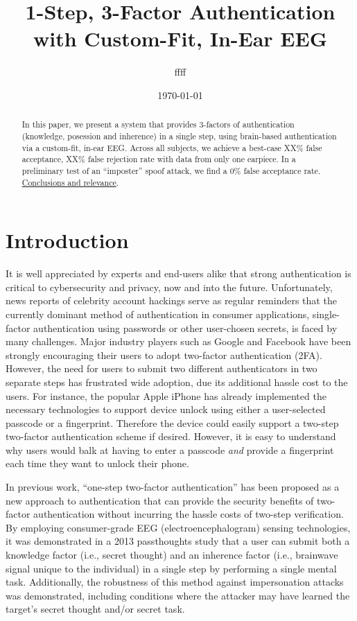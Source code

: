\documentclass[11pt]{article}
\author{ffff}
\date{\today}
\title{1-Step, 3-Factor Authentication with Custom-Fit, In-Ear EEG}
\begin{document}
\maketitle
\begin{abstract}
In this paper, we present a system that provides 3-factors of authentication (knowledge, posession and inherence) in a single step, using brain-based authentication via a custom-fit, in-ear EEG. Across all subjects, we achieve a best-case XX\% false acceptance, XX\% false rejection rate with data from only one earpiece. In a preliminary test of an ``imposter'' spoof attack, we find a 0\% false acceptance rate. \underline{Conclusions and relevance}.
\end{abstract}

\section{Introduction}
\label{sec:org7196b99}

It is well appreciated by experts and end-users alike that strong authentication is
critical to cybersecurity and privacy, now and into the future. Unfortunately,
news 
reports of celebrity account hackings serve as regular reminders that
the currently dominant method of authentication in consumer applications, 
single-factor authentication using passwords or other user-chosen secrets, 
is faced by many challenges. Major industry players such as Google and
Facebook have been strongly encouraging their users to adopt two-factor
authentication (2FA). However, the need for users to submit two different 
authenticators in two separate steps has frustrated wide adoption, 
due its additional hassle cost to the users. For instance, the popular Apple
iPhone has already implemented the necessary technologies to support device
unlock using either a user-selected passcode or a fingerprint. Therefore the
device could easily support a two-step two-factor authentication scheme if
desired. However, it is easy to understand why users would balk at having to
enter a passcode \emph{and} provide a fingerprint each time they want to unlock their phone.

In previous work, “one-step two-factor authentication” has been proposed as a
new approach to authentication that can provide the security benefits of two-
factor authentication without incurring the hassle costs of two-step verification.
By employing consumer-grade EEG (electroencephalogram) sensing
technologies, it was demonstrated in a 2013 passthoughts study that a user can
submit both a knowledge factor (i.e., secret thought) and an inherence factor
(i.e., brainwave signal unique to the individual) in a single step by performing a
single mental task. Additionally, the robustness of this method against
impersonation attacks was demonstrated, including conditions where the attacker
may have learned the target’s secret thought and/or secret task.
\end{document}
